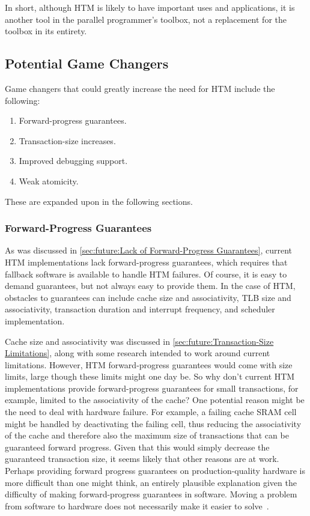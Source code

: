 In short, although HTM is likely to have important uses and applications,
it is another tool in the parallel programmer's toolbox, not a replacement
for the toolbox in its entirety.

\subsection{Potential Game Changers}
\label{sec:future:Potential Game Changers}

Game changers that could greatly increase the need for HTM include
the following:

\begin{enumerate}
\item	Forward-progress guarantees.
\item	Transaction-size increases.
\item	Improved debugging support.
\item	Weak atomicity.
\end{enumerate}

These are expanded upon in the following sections.

\subsubsection{Forward-Progress Guarantees}
\label{sec:future:Forward-Progress Guarantees}

As was discussed in
\cref{sec:future:Lack of Forward-Progress Guarantees},
current HTM implementations lack forward-progress guarantees, which requires
that fallback software is available to handle HTM failures.
Of course, it is easy to demand guarantees, but not always easy
to provide them.
In the case of HTM, obstacles to guarantees can include cache size and
associativity, TLB size and associativity, transaction duration and
interrupt frequency, and scheduler implementation.

Cache size and associativity was discussed in
\cref{sec:future:Transaction-Size Limitations},
along with some research intended to work around current limitations.
However, HTM forward-progress guarantees would
come with size limits, large though these limits might one day be.
So why don't current HTM implementations provide forward-progress
guarantees for small transactions, for example, limited to the
associativity of the cache?
One potential reason might be the need to deal with hardware failure.
For example, a failing cache SRAM cell might be handled by deactivating
the failing cell, thus reducing the associativity of the cache and
therefore also the maximum size of transactions that can be guaranteed
forward progress.
Given that this would simply decrease the guaranteed transaction size,
it seems likely that other reasons are at work.
Perhaps providing forward progress guarantees on production-quality
hardware is more difficult than one might think, an entirely plausible
explanation given the difficulty of making forward-progress guarantees
in software.
Moving a problem from software to hardware does not necessarily make
it easier to solve~\cite{ChristianJacobi2012MainframeTM}.

